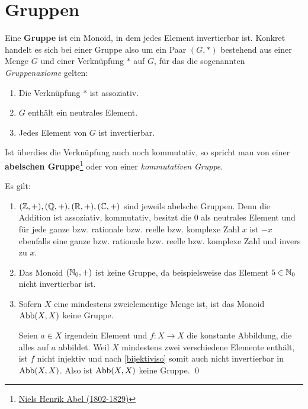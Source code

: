 \section{Gruppen}


\begin{defin}[Gruppe]  
    Eine \textbf{Gruppe} ist ein Monoid, in dem jedes Element invertierbar ist. Konkret handelt es sich bei einer Gruppe also um ein Paar $(G,*)$ bestehend aus einer Menge $G$ und einer Verknüpfung $*$ auf $G$, für das die sogenannten \emph{Gruppenaxiome} gelten:
    \begin{enumerate}[(G1), labelindent=1.5em, leftmargin=*]
        \item Die Verknüpfung $*$ ist assoziativ.
        \item $G$ enthält ein neutrales Element.
        \item Jedes Element von $G$ ist invertierbar.
    \end{enumerate}
    Ist überdies die Verknüpfung auch noch kommutativ, so spricht man von einer \textbf{abelschen Gruppe}\footnote{\href{https://de.wikipedia.org/wiki/Niels_Henrik_Abel}{Niels Henrik Abel (1802-1829)}} oder von einer \emph{kommutativen Gruppe}.
\end{defin}


\begin{bsp}
    Es gilt:
    \begin{enumerate}
        \item $(\mathbb Z,+),(\mathbb Q,+),(\mathbb R,+),(\mathbb C,+)$ sind jeweils abelsche Gruppen. Denn die Addition ist assoziativ, kommutativ, besitzt die $0$ als neutrales Element und für jede ganze bzw. rationale bzw. reelle bzw. komplexe Zahl $x$ ist $-x$ ebenfalls eine ganze bzw. rationale bzw. reelle bzw. komplexe Zahl und invers zu $x$.
        \item Das Monoid $(\mathbb N_0,+)$ ist keine Gruppe, da beispielsweise das Element $5\in \mathbb N_0$ nicht invertierbar ist.
        \item Sofern $X$ eine mindestens zweielementige Menge ist, ist das Monoid $\operatorname{Abb}(X,X)$ keine Gruppe.
        \begin{bew}[(*)]
            Seien $a\in X$ irgendein Element und $f:X\to X$ die konstante Abbildung, die alles auf $a$ abbildet. Weil $X$ mindestens zwei verschiedene Elemente enthält, ist $f$ nicht injektiv und nach \cref{bijektiviso} somit auch nicht invertierbar in $\operatorname{Abb}(X,X)$. Also ist $\operatorname{Abb}(X,X)$ keine Gruppe. \qed
        \end{bew}
    \end{enumerate}
\end{bsp}


